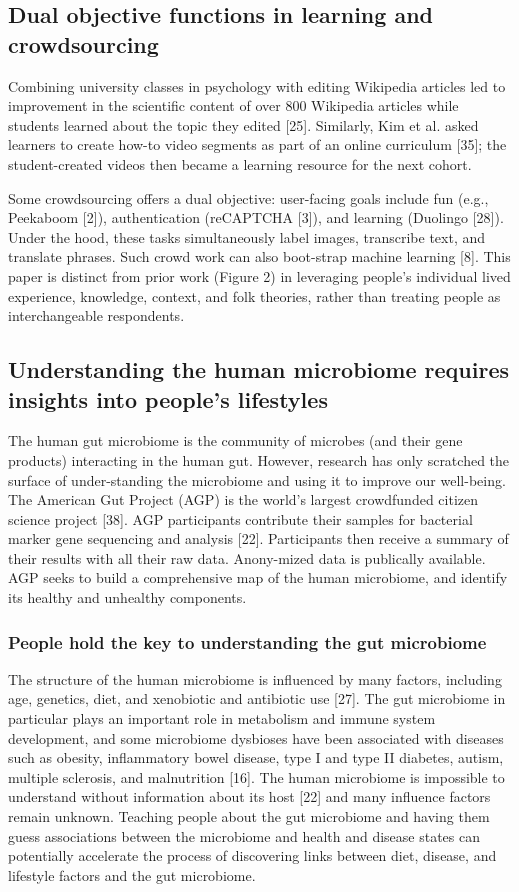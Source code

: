 \subsection{Dual objective functions in learning and crowdsourcing}
Combining university classes in psychology with editing Wikipedia articles led to improvement in the scientific content of over 800 Wikipedia articles while students learned about the topic they edited [25]. Similarly, Kim et al. asked learners to create how-to video segments as part of an online curriculum [35]; the student-created videos then became a learning resource for the next cohort.

Some crowdsourcing offers a dual objective: user-facing goals include fun (e.g., Peekaboom [2]), authentication (reCAPTCHA [3]), and learning (Duolingo [28]). Under the hood, these tasks simultaneously label images, transcribe text, and translate phrases. Such crowd work can also boot-strap machine learning [8]. This paper is distinct from prior work (Figure 2) in leveraging people’s individual lived experience, knowledge, context, and folk theories, rather than treating people as interchangeable respondents.

\subsection{Understanding the human microbiome requires insights into people’s lifestyles}
The human gut microbiome is the community of microbes (and their gene products) interacting in the human gut. However, research has only scratched the surface of under-standing the microbiome and using it to improve our well-being. The American Gut Project (AGP) is the world's largest crowdfunded citizen science project [38]. AGP participants contribute their samples for bacterial marker gene sequencing and analysis [22]. Participants then receive a summary of their results with all their raw data. Anony-mized data is publically available. AGP seeks to build a comprehensive map of the human microbiome, and identify its healthy and unhealthy components.

\subsubsection{People hold the key to understanding the gut microbiome}
The structure of the human microbiome is influenced by many factors, including age, genetics, diet, and xenobiotic and antibiotic use [27]. The gut microbiome in particular plays an important role in metabolism and immune system development, and some microbiome dysbioses have been associated with diseases such as obesity, inflammatory bowel disease, type I and type II diabetes, autism, multiple sclerosis, and malnutrition [16]. The human microbiome is impossible to understand without information about its host [22] and many influence factors remain unknown. Teaching people about the gut microbiome and having them guess associations between the microbiome and health and disease states can potentially accelerate the process of discovering links between diet, disease, and lifestyle factors and the gut microbiome.

